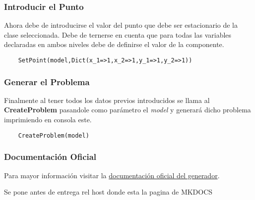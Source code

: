 \begin{itemize}
\end{itemize}


\subsubsection{Introducir el Punto}
Ahora debe de introducirse el valor del punto que debe ser estacionario de la clase seleccionada.
Debe de ternerse en cuenta que para todas las variables declaradas en ambos niveles debe de definirse el valor de la componente.

\begin{lstlisting}
    SetPoint(model,Dict(x_1=>1,x_2=>1,y_1=>1,y_2=>1))
\end{lstlisting}

\subsubsection{Generar el Problema}
Finalmente al tener todos los datos previos introducidos se llama al \textbf{CreateProblem} pasandole como parámetro el \textit{model} 
y generará dicho problema imprimiendo en consola este.

\begin{lstlisting}
    CreateProblem(model)
\end{lstlisting}


\subsubsection{Documentación Oficial}
Para mayor información visitar la \href{https://github.com/FVSB/Tesis}{documentación oficial del generador}. 

Se pone antes de entrega rel host donde esta la pagina de MKDOCS
